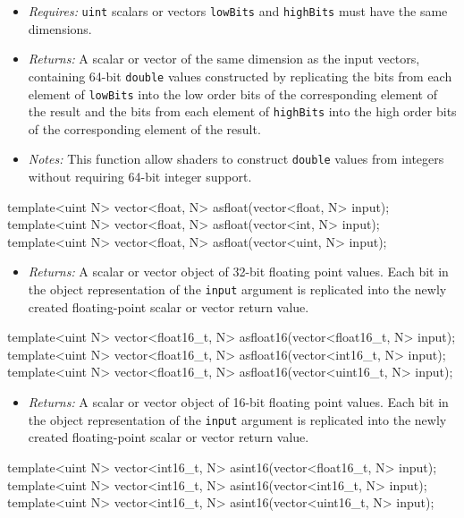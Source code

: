 \begin{itemize}
  \item \textit{Requires:} \texttt{uint} scalars or vectors \texttt{lowBits} and
  \texttt{highBits} must have the same dimensions.
  \item \textit{Returns:} A scalar or vector of the same dimension as the input
  vectors, containing 64-bit \texttt{double} values constructed by replicating
  the bits from each element of \texttt{lowBits} into the low order bits of the
  corresponding element of the result and the bits from each element of
  \texttt{highBits} into the high order bits of the corresponding element of the
  result.
  \item \textit{Notes:} This function allow shaders to construct \texttt{double}
  values from integers without requiring 64-bit integer support.
\end{itemize}

\begin{HLSL}
template<uint N> vector<float, N> asfloat(vector<float, N> input);
template<uint N> vector<float, N> asfloat(vector<int, N> input);
template<uint N> vector<float, N> asfloat(vector<uint, N> input);
\end{HLSL}

\begin{itemize}
  \item \textit{Returns:} A scalar or vector object of 32-bit floating point
  values. Each bit in the object representation of the \texttt{input} argument
  is replicated into the newly created floating-point scalar or
  vector return value.
\end{itemize}

\begin{HLSL}
template<uint N> vector<float16\_t, N> asfloat16(vector<float16\_t, N> input);
template<uint N> vector<float16\_t, N> asfloat16(vector<int16\_t, N> input);
template<uint N> vector<float16\_t, N> asfloat16(vector<uint16\_t, N> input);
\end{HLSL}

\begin{itemize}
  \item \textit{Returns:} A scalar or vector object of 16-bit floating point
  values. Each bit in the object representation of the \texttt{input} argument
  is replicated into the newly created floating-point scalar or vector return
  value.
\end{itemize}

\begin{HLSL}
template<uint N> vector<int16\_t, N> asint16(vector<float16\_t, N> input);
template<uint N> vector<int16\_t, N> asint16(vector<int16\_t, N> input);
template<uint N> vector<int16\_t, N> asint16(vector<uint16\_t, N> input);
\end{HLSL}


